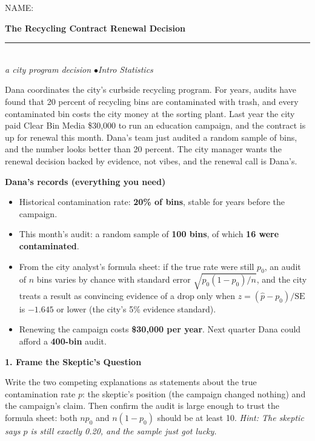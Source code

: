 \documentclass[11pt]{article}
\newcommand{\question}[1]{\medskip\noindent\textbf{#1}\par\smallskip}
\newcommand{\hint}[1]{{\small\color{gray}\textit{Hint: #1}}\par}
\begin{document}
{\small NAME: \underline{\hspace{2.6in}}}\par\vspace{6pt}
\begin{center}
{\LARGE\bfseries The Recycling Contract Renewal Decision}\\[3pt]
\rule{2.2in}{0.8pt}\\[5pt]
{\itshape a city program decision \quad$\bullet$\quad Intro Statistics}
\end{center}

\vspace{4pt}

Dana coordinates the city's curbside recycling program. For years, audits have found that 20 percent of recycling bins are contaminated with trash, and every contaminated bin costs the city money at the sorting plant. Last year the city paid Clear Bin Media \$30{,}000 to run an education campaign, and the contract is up for renewal this month. Dana's team just audited a random sample of bins, and the number looks better than 20 percent. The city manager wants the renewal decision backed by evidence, not vibes, and the renewal call is Dana's.

\medskip
\begin{databox}
\textbf{Dana's records (everything you need)}
\begin{itemize}[leftmargin=14pt, itemsep=3pt, topsep=4pt]
\item Historical contamination rate: \textbf{20\% of bins}, stable for years before the campaign.
\item This month's audit: a random sample of \textbf{100 bins}, of which \textbf{16 were contaminated}.
\item From the city analyst's formula sheet: if the true rate were still $p_0$, an audit of $n$ bins varies by chance with standard error $\sqrt{p_0(1-p_0)/n}$, and the city treats a result as convincing evidence of a drop only when $z = (\hat{p} - p_0)/\text{SE}$ is $-1.645$ or lower (the city's 5\% evidence standard).
\item Renewing the campaign costs \textbf{\$30{,}000 per year}. Next quarter Dana could afford a \textbf{400-bin} audit.
\end{itemize}
\end{databox}

\question{1. Frame the Skeptic's Question}
Write the two competing explanations as statements about the true contamination rate $p$: the skeptic's position (the campaign changed nothing) and the campaign's claim. Then confirm the audit is large enough to trust the formula sheet: both $np_0$ and $n(1-p_0)$ should be at least 10.
\hint{The skeptic says $p$ is still exactly 0.20, and the sample just got lucky.}
\end{document}
